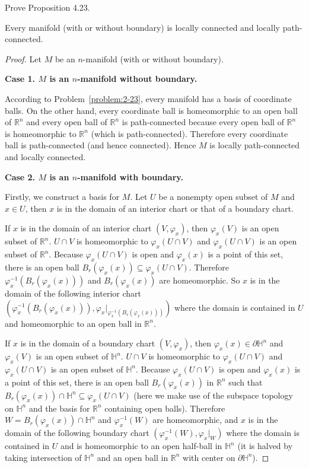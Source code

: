 \begin{exercise}{4.24}
	Prove Proposition 4.23.

	Every manifold (with or without boundary) is locally connected and locally path-connected.
\end{exercise}

\begin{proof}
	Let $M$ be an $n$-manifold (with or without boundary).

	\textbf{Case 1. $M$ is an $n$-manifold without boundary.}

	According to Problem~\ref{problem:2-23}, every manifold has a basis of coordinate balls. On the other hand, every coordinate ball is homeomorphic to an open ball of $\mathbb{R}^{n}$ and every open ball of $\mathbb{R}^{n}$ is path-connected because every open ball of $\mathbb{R}^{n}$ is homeomorphic to $\mathbb{R}^{n}$ (which is path-connected). Therefore every coordinate ball is path-connected (and hence connected). Hence $M$ is locally path-connected and locally connected.

	\textbf{Case 2. $M$ is an $n$-manifold with boundary.}

	Firstly, we construct a basis for $M$. Let $U$ be a nonempty open subset of $M$ and $x\in U$, then $x$ is in the domain of an interior chart or that of a boundary chart.

	If $x$ is in the domain of an interior chart $(V, \varphi_{x})$, then $\varphi_{x}(V)$ is an open subset of $\mathbb{R}^{n}$. $U\cap V$ is homeomorphic to $\varphi_{x}(U\cap V)$ and $\varphi_{x}(U\cap V)$ is an open subset of $\mathbb{R}^{n}$. Because $\varphi_{x}(U\cap V)$ is open and $\varphi_{x}(x)$ is a point of this set, there is an open ball $B_{r}(\varphi_{x}(x)) \subseteq \varphi_{x}(U\cap V)$. Therefore $\varphi_{x}^{-1}(B_{r}(\varphi_{x}(x)))$ and $B_{r}(\varphi_{x}(x))$ are homeomorphic. So $x$ is in the domain of the following interior chart $(\varphi_{x}^{-1}(B_{r}(\varphi_{x}(x))), \varphi_{x}\vert_{\varphi_{x}^{-1}(B_{r}(\varphi_{x}(x)))})$ where the domain is contained in $U$ and homeomorphic to an open ball in $\mathbb{R}^{n}$.

	If $x$ is in the domain of a boundary chart $(V, \varphi_{x})$, then $\varphi_{x}(x) \in \partial\mathbb{H}^{n}$ and $\varphi_{x}(V)$ is an open subset of $\mathbb{H}^{n}$. $U\cap V$ is homeomorphic to $\varphi_{x}(U\cap V)$ and $\varphi_{x}(U\cap V)$ is an open subset of $\mathbb{H}^{n}$. Because $\varphi_{x}(U\cap V)$ is open and $\varphi_{x}(x)$ is a point of this set, there is an open ball $B_{r}(\varphi_{x}(x))$ in $\mathbb{R}^{n}$ such that $B_{r}(\varphi_{x}(x)) \cap \mathbb{H}^{n} \subseteq \varphi_{x}(U\cap V)$ (here we make use of the subspace topology on $\mathbb{H}^{n}$ and the basis for $\mathbb{R}^{n}$ containing open balls). Therefore $W = B_{r}(\varphi_{x}(x)) \cap \mathbb{H}^{n}$ and $\varphi_{x}^{-1}(W)$ are homeomorphic, and $x$ is in the domain of the following boundary chart $(\varphi_{x}^{-1}(W), \varphi_{x}\vert_{W})$ where the domain is contained in $U$ and is homeomorphic to an open half-ball in $\mathbb{H}^{n}$ (it is halved by taking intersection of $\mathbb{H}^{n}$ and an open ball in $\mathbb{R}^{n}$ with center on $\partial \mathbb{H}^{n}$).


\end{proof}
